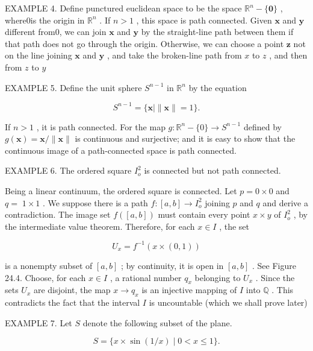 \documentclass[10pt]{article}
\begin{document}
EXAMPLE 4. Define punctured euclidean space to be the space \({\mathbb{R}}^{n} - \{ \mathbf{0}\}\) , where0is the origin in \({\mathbb{R}}^{n}\) . If \(n > 1\) , this space is path connected. Given \(\mathbf{x}\) and \(\mathbf{y}\) different from0, we can join \(\mathbf{x}\) and \(\mathbf{y}\) by the straight-line path between them if that path does not go through the origin. Otherwise, we can choose a point \(\mathbf{z}\) not on the line joining \(\mathbf{x}\) and \(\mathbf{y}\) , and take the broken-line path from \(x\) to \(z\) , and then from \(z\) to \(y\)

EXAMPLE 5. Define the unit sphere \({S}^{n - 1}\) in \({\mathbb{R}}^{n}\) by the equation

\[
{S}^{n - 1} = \{ \mathbf{x} \mid  \parallel \mathbf{x}\parallel  = 1\} .
\]

If \(n > 1\) , it is path connected. For the map \(g : {\mathbb{R}}^{n} - \{ 0\}  \rightarrow  {S}^{n - 1}\) defined by \(g\left( \mathbf{x}\right)  = \mathbf{x}/\parallel \mathbf{x}\parallel\) is continuous and surjective; and it is easy to show that the continuous image of a path-connected space is path connected.

EXAMPLE 6. The ordered square \({I}_{o}^{2}\) is connected but not path connected.

Being a linear continuum, the ordered square is connected. Let \(p = 0 \times  0\) and \(q = \; 1 \times  1\) . We suppose there is a path \(f : \left\lbrack  {a,b}\right\rbrack   \rightarrow  {I}_{o}^{2}\) joining \(p\) and \(q\) and derive a contradiction. The image set \(f\left( \left\lbrack  {a,b}\right\rbrack  \right)\) must contain every point \(x \times  y\) of \({I}_{o}^{2}\) , by the intermediate value theorem. Therefore, for each \(x \in  I\) , the set

\[
{U}_{x} = {f}^{-1}\left( {x \times  \left( {0,1}\right) }\right)
\]

is a nonempty subset of \(\left\lbrack  {a,b}\right\rbrack\) ; by continuity, it is open in \(\left\lbrack  {a,b}\right\rbrack\) . See Figure 24.4. Choose, for each \(x \in  I\) , a rational number \({q}_{x}\) belonging to \({U}_{x}\) . Since the sets \({U}_{x}\) are disjoint, the map \(x \rightarrow  {q}_{x}\) is an injective mapping of \(I\) into \(\mathbb{Q}\) . This contradicts the fact that the interval \(I\) is uncountable (which we shall prove later)

EXAMPLE 7. Let \(S\) denote the following subset of the plane.

\[
S = \{ x \times  \sin \left( {1/x}\right)  \mid  0 < x \leq  1\} .
\]
\end{document}
